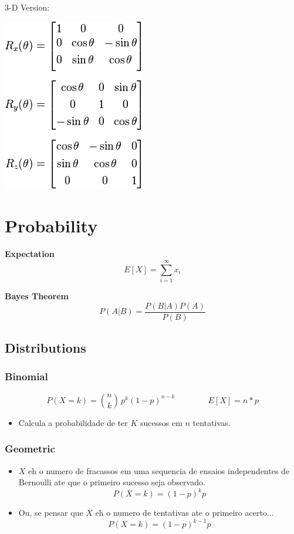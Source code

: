 \documentclass[10pt, twocolumn]{article}
\begin{document}
\begin{flushleft}
3-D Version:\\
\begin{center}
\includegraphics[scale=0.7]{rm3d.png}
\end{center}



\section{Probability}

\textbf{Expectation}
$$E[X] = \sum_{i=1}^{\infty} x_i$$

\textbf{Bayes Theorem}
$$P(A|B) = \frac{P(B|A) P(A)}{P(B)}$$

\subsection{Distributions}
\subsubsection{Binomial}

$$P(X = k) = \binom{n}{k}\,p^{k}(1-p)^{n-k} \qquad \qquad E[X] = n*p$$

\begin{itemize}
\item Calcula a probabilidade de ter $K$ sucessos em $n$ tentativas.
\end{itemize}



\subsubsection{Geometric}
\begin{itemize}
\item $X$ eh o numero de fracassos em uma sequencia de ensaios independentes de Bernoulli ate que o primeiro sucesso seja observado.$$P(X = k) = (1-p)^{k}p$$
\item Ou, se pensar que $X$ eh o numero de tentativas ate o primeiro acerto...
$$P(X = k) = (1-p)^{k-1}p$$
\end{itemize}



\end{flushleft}
\end{document}
